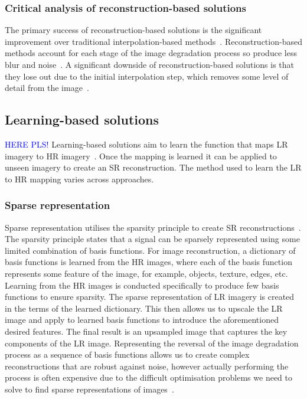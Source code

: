 \subsubsection{Critical analysis of reconstruction-based solutions}
The primary success of reconstruction-based solutions is the significant improvement over traditional interpolation-based methods~\cite{interpolation}. Reconstruction-based methods account for each stage of the image degradation process so produce less blur and noise~\cite{interpolation}. A significant downside of reconstruction-based solutions is that they lose out due to the initial interpolation step, which removes some level of detail from the image~\cite{remoteSensingGANsReview}.

\subsection{Learning-based solutions}
\textcolor{blue}{HERE PLS!} Learning-based solutions aim to learn the function that maps LR imagery to HR imagery~\cite{superResRemoteSensingOverview}. Once the mapping is learned it can be applied to unseen imagery to create an SR reconstruction. The method used to learn the LR to HR mapping varies across approaches.

\subsubsection{Sparse representation}
Sparse representation utilises the sparsity principle to create SR reconstructions~\cite{superResRemoteSensingOverview}. The sparsity principle states that a signal can be sparsely represented using some limited combination of basis functions. For image reconstruction, a dictionary of basis functions is learned from the HR images, where each of the basis function represents some feature of the image, for example, objects, texture, edges, etc. Learning from the HR images is conducted specifically to produce few basis functions to ensure sparsity. The sparse representation of LR imagery is created in the terms of the learned dictionary. This then allows us to upscale the LR image and apply to learned basis functions to introduce the aforementioned desired features. The final result is an upsampled image that captures the key components of the LR image. Representing the reversal of the image degradation process as a sequence of basis functions allows us to create complex reconstructions that are robust against noise, however actually performing the process is often expensive due to the difficult optimisation problems we need to solve to find sparse representations of images~\cite{sparseRep}.

